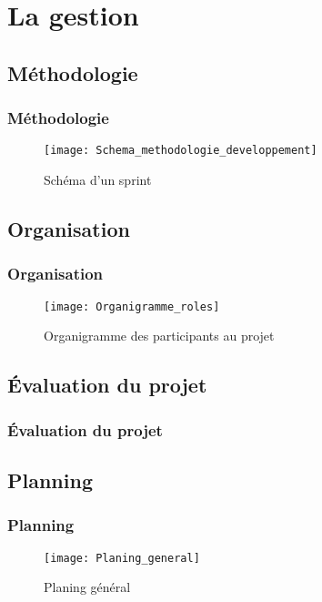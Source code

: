 \section{La gestion}
\subsection{Méthodologie}
\begin{frame}
  \frametitle{\color{white} Méthodologie}
  \begin{figure}[p]
    \centering
    \texttt{[image: Schema\_methodologie\_developpement]}
    \caption{Schéma d'un sprint}
  \end{figure}
\end{frame}
\subsection{Organisation}
\begin{frame}
  \frametitle{\color{white} Organisation}
  \begin{figure}[p]
    \centering
    \texttt{[image: Organigramme\_roles]}
    \caption{Organigramme des participants au projet}
  \end{figure}
\end{frame}
\subsection{Évaluation du projet}
\begin{frame}
  \frametitle{\color{white} Évaluation du projet}
 
\end{frame}
\subsection{Planning}
\begin{frame}
  \frametitle{\color{white} Planning}
  \begin{figure}[p]
    \centering
    \texttt{[image: Planing\_general]}
    \caption{Planing général}
  \end{figure}
\end{frame}